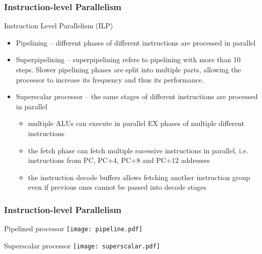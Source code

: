 \documentclass{beamer}
\begin{document}
\begin{frame}
\frametitle{Instruction-level Parallelism}

Instruction Level Parallelism (ILP)
\begin{itemize}
 \item Pipelining -- different phases of different instructions are processed in parallel
 \item Superpipelining -- superpipelining refers to pipelining with more than 10 steps. Slower pipelining phases are split into multiple parts, allowing the processor to increase its frequency and thus its performance.
 \item Superscalar processor -- the same stages of different instructions are processed in parallel
\begin{itemize}
\item multiple ALUs can execute in parallel EX phases of multiple different instructions
\item the fetch phase can fetch multiple sucessive instructions in parallel, i.e. instructions from PC, PC+4, PC+8 and PC+12 addresses
\item the instruction decode buffers allows fetching another instruction group even if previous ones cannot be passed into decode stages
\end{itemize}
\end{itemize}

\end{frame}

\begin{frame}
\frametitle{Instruction-level Parallelism}

Pipelined processor
\texttt{[image: pipeline.pdf]}

Superscalar processor
\texttt{[image: superscalar.pdf]}

\end{frame}
\end{document}

